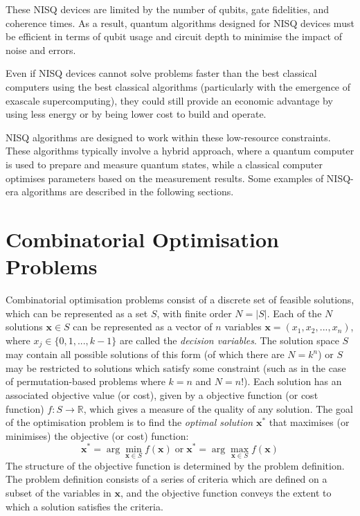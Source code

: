 These NISQ devices are limited by the number of qubits, gate fidelities, and coherence times. As a result, quantum algorithms designed for NISQ devices must be efficient in terms of qubit usage and circuit depth to minimise the impact of noise and errors. 

Even if NISQ devices cannot solve problems faster than the best classical computers using the best classical algorithms (particularly with the emergence of exascale supercomputing), they could still provide an economic advantage by using less energy or by being lower cost to build and operate.

NISQ algorithms are designed to work within these low-resource constraints. These algorithms typically involve a hybrid approach, where a quantum computer is used to prepare and measure quantum states, while a classical computer optimises parameters based on the measurement results. Some examples of NISQ-era algorithms are described in the following sections.

\section{Combinatorial Optimisation Problems}\label{sec:cop}
Combinatorial optimisation problems consist of a discrete set of feasible solutions, which can be represented as a set $S$, with finite order $N=|S|$. Each of the $N$ solutions $\mathbf{x} \in S$ can be represented as a vector of $n$ variables $\mathbf{x}=(x_1, x_2,...,x_n)$, where $x_j\in\{0,1,...,k-1\}$ are called the \textit{decision variables}. The solution space $S$ may contain all possible solutions of this form (of which there are $N=k^n$) or $S$ may be restricted to solutions which satisfy some constraint (such as in the case of permutation-based problems where $k=n$ and $N=n!$). Each solution has an associated objective value (or cost), given by a objective function (or cost function) $f:S\rightarrow\mathbb{R}$, which gives a measure of the quality of any solution. The goal of the optimisation problem is to find the \textit{optimal solution} $\mathbf{x}^*$ that maximises (or minimises) the objective (or cost) function:
$$\mathbf{x}^* = \arg\min_{\mathbf{x} \in S} f(\mathbf{x})
\;\text{or}\;
\mathbf{x}^* = \arg\max_{\mathbf{x} \in S} f(\mathbf{x})$$
The structure of the objective function is determined by the problem definition. The problem definition consists of a series of criteria which are defined on a subset of the variables in $\mathbf{x}$, and the objective function conveys the extent to which a solution satisfies the criteria.

